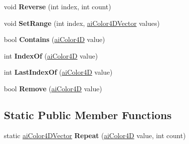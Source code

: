 \begin{DoxyCompactItemize}
\item 
\hypertarget{classai_color4_d_vector_aafc07cc275c7df60a0bbd5e83ac05722}{void {\bfseries Reverse} (int index, int count)}\label{classai_color4_d_vector_aafc07cc275c7df60a0bbd5e83ac05722}

\item 
\hypertarget{classai_color4_d_vector_a15064078e84f71e868662520fdd5d927}{void {\bfseries Set\+Range} (int index, \hyperlink{classai_color4_d_vector}{ai\+Color4\+D\+Vector} values)}\label{classai_color4_d_vector_a15064078e84f71e868662520fdd5d927}

\item 
\hypertarget{classai_color4_d_vector_a8db97854f44dc5bcc5a7bbdbbdfe4df9}{bool {\bfseries Contains} (\hyperlink{structai_color4_d}{ai\+Color4\+D} value)}\label{classai_color4_d_vector_a8db97854f44dc5bcc5a7bbdbbdfe4df9}

\item 
\hypertarget{classai_color4_d_vector_a0b48ad2f601873f2355f6a7378dbec74}{int {\bfseries Index\+Of} (\hyperlink{structai_color4_d}{ai\+Color4\+D} value)}\label{classai_color4_d_vector_a0b48ad2f601873f2355f6a7378dbec74}

\item 
\hypertarget{classai_color4_d_vector_a10d74801f07994bc0aa30d831bc3dae2}{int {\bfseries Last\+Index\+Of} (\hyperlink{structai_color4_d}{ai\+Color4\+D} value)}\label{classai_color4_d_vector_a10d74801f07994bc0aa30d831bc3dae2}

\item 
\hypertarget{classai_color4_d_vector_ae48166d7c778711e003f6581a644371a}{bool {\bfseries Remove} (\hyperlink{structai_color4_d}{ai\+Color4\+D} value)}\label{classai_color4_d_vector_ae48166d7c778711e003f6581a644371a}

\end{DoxyCompactItemize}
\subsection*{Static Public Member Functions}
\begin{DoxyCompactItemize}
\item 
\hypertarget{classai_color4_d_vector_a226e5bc903d310d36a7829e1cfd2b468}{static \hyperlink{classai_color4_d_vector}{ai\+Color4\+D\+Vector} {\bfseries Repeat} (\hyperlink{structai_color4_d}{ai\+Color4\+D} value, int count)}\label{classai_color4_d_vector_a226e5bc903d310d36a7829e1cfd2b468}

\end{DoxyCompactItemize}
